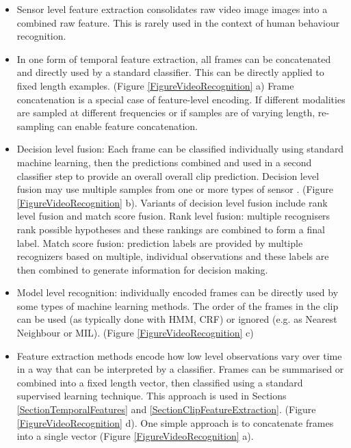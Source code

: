 \begin{itemize}
 \item Sensor level feature extraction consolidates raw video image images into a combined raw feature. This is rarely used in the context of human behaviour recognition.
 \item In one form of temporal feature extraction, all frames can be concatenated and directly used by a standard classifier. This can be directly applied to fixed length examples. (Figure \ref{FigureVideoRecognition} a) Frame concatenation is a special case of feature-level encoding. If different modalities are sampled at different frequencies or if samples are of varying length, re-sampling can enable feature concatenation.
 \item Decision level fusion: Each frame can be classified individually using standard machine learning, then the predictions combined and used in a second classifier step to provide an overall overall clip prediction. Decision level fusion may use multiple samples from one or more types of sensor \cite{Vakayallapati2011}. (Figure \ref{FigureVideoRecognition} b). Variants of decision level fusion include rank level fusion and match score fusion. Rank level fusion: multiple recognisers rank possible hypotheses and these rankings are combined to form a final label. Match score fusion: prediction labels are provided by multiple recognizers based on multiple, individual observations and these labels are then combined to generate information for decision making.
 \item Model level recognition: individually encoded frames can be directly used by some types of machine learning methods. The order of the frames in the clip can be used (as typically done with \ac{HMM}, \ac{CRF}) or ignored (e.g. as Nearest Neighbour or \ac{MIL}). (Figure \ref{FigureVideoRecognition} c)
 \item Feature extraction methods 
 encode how low level observations vary over time in a way that can be interpreted by a classifier. Frames can be summarised or combined into a fixed length vector, then classified using a standard supervised learning technique. This approach is used in Sections \ref{SectionTemporalFeatures} and \ref{SectionClipFeatureExtraction}. (Figure \ref{FigureVideoRecognition} d). One simple approach is to concatenate frames into a single vector (Figure \ref{FigureVideoRecognition} a). 
\end{itemize}

